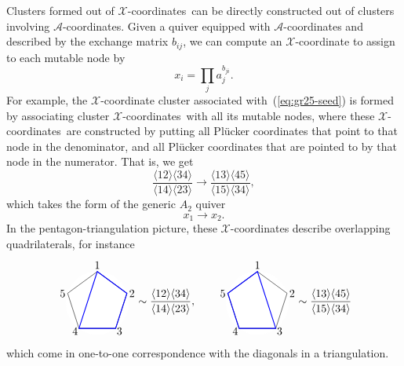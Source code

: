 \documentclass[11pt]{article}
\def\ket#1{\langle #1 \rangle}
\def\x{\mathcal{X}}
\def\xcoords{$\mathcal{X}$-coordinates}
\def\a{\mathcal{A}}
\def\acoords{$\mathcal{A}$-coordinates}
\def\drawLabeledPentagon{
\coordinate (P1) at (90:1);
\coordinate (P2) at (18:1);
\coordinate (P3) at (306:1);
\coordinate (P4) at (234:1);
\coordinate (P5) at (162:1);
\draw[white,fill=white] (0,0) circle (1cm);
\draw (P1) -- (P2) -- (P3) -- (P4) -- (P5) -- cycle;
\draw (0,1.2) node {1};
\draw (.9,.3) node[anchor=west] {2};
\draw (.5,-.9) node[anchor=west] {3};
\draw (-.5,-.9) node[anchor=east] {4};
\draw (-.9,.3) node[anchor=east] {5};
}
\begin{document}
Clusters formed out of \xcoords\ can be directly constructed out of clusters involving \acoords. Given a quiver equipped with $\a$-coordinates and described by the exchange matrix $b_{ij}$, we can compute an $\x$-coordinate to assign to each mutable node by
\begin{equation} \label{eq:x_from_a_coordinates}
	x_i = \prod_j a_j^{b_{ji}}. 	
\end{equation} 
For example, the $\x$-coordinate cluster associated with~(\ref{eq:gr25-seed}) is formed by associating cluster \xcoords\ with all its mutable nodes, where these \xcoords\ are constructed by putting all Pl\"ucker coordinates that point to that node in the denominator, and all Pl\"ucker coordinates that are pointed to by that node in the numerator. That is, we get
\begin{equation} \label{eq:a2_x_seed}
	\frac{\ket{12}\ket{34}}{\ket{14}\ket{23}} \to \frac{\ket{13}\ket{45}}{\ket{15}\ket{34}},
\end{equation}
which takes the form of the generic $A_2$ quiver
\begin{equation} \label{def:xcoordsA2}
	x_1 \to x_2.
\end{equation}
In the pentagon-triangulation picture, these $\x$-coordinates describe overlapping quadrilaterals, for instance
\begin{align}\begin{gathered}
\begin{tikzpicture}
  \drawLabeledPentagon
  \draw[color=blue, thick] (P1) -- (P2) -- (P3) -- (P4) -- cycle;
\end{tikzpicture} 
\begin{aligned}
\sim \frac{\ket{12}\ket{34}}{\ket{14}\ket{23}},  \\[1.6cm] \
\end{aligned} \qquad 
\begin{tikzpicture}
  \drawLabeledPentagon
  \draw[color=blue, thick] (P1) -- (P3) -- (P4) -- (P5) -- cycle;
\end{tikzpicture}  
\begin{aligned}
\sim \frac{\ket{13}\ket{45}}{\ket{15}\ket{34}} \\[1.6cm] \
\end{aligned}
\vspace{-1.4cm}
\end{gathered}
\end{align}
which come in one-to-one correspondence with the diagonals in a triangulation.
\end{document}
